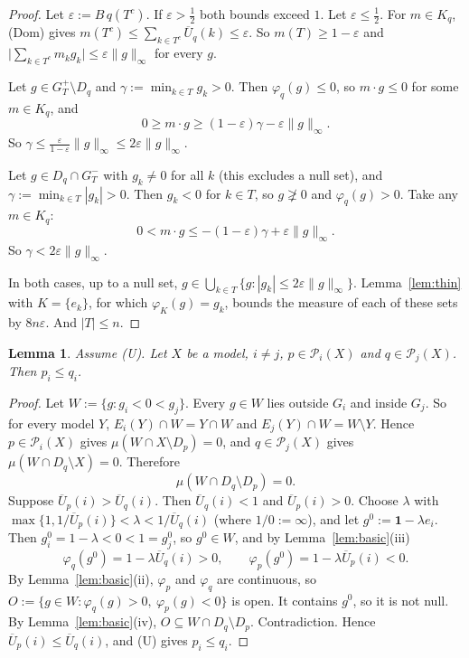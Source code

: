 \documentclass[11pt]{article}
\newtheorem{lemma}[theorem]{Lemma}
\theoremstyle{definition}
\newcommand{\one}{\mathbf 1}
\newcommand{\Pc}{\mathcal P}
\newcommand{\Ub}{\overline U}
\begin{document}
\begin{proof}
Let $\varepsilon:=B\,q(T^c)$. If $\varepsilon>\frac12$ both bounds exceed $1$. Let $\varepsilon\le\frac12$. For $m\in K_q$, (Dom) gives $m(T^c)\le\sum_{k\in T^c}\Ub_q(k)\le\varepsilon$. So $m(T)\ge 1-\varepsilon$ and $\big|\sum_{k\in T^c}m_kg_k\big|\le\varepsilon\|g\|_\infty$ for every $g$.

Let $g\in G_T^+\setminus D_q$ and $\gamma:=\min_{k\in T}g_k>0$. Then $\varphi_q(g)\le 0$, so $m\cdot g\le0$ for some $m\in K_q$, and
\[
0\ge m\cdot g\ge(1-\varepsilon)\gamma-\varepsilon\|g\|_\infty .
\]
So $\gamma\le\frac{\varepsilon}{1-\varepsilon}\|g\|_\infty\le 2\varepsilon\|g\|_\infty$.

Let $g\in D_q\cap G_T^-$ with $g_k\neq0$ for all $k$ (this excludes a null set), and $\gamma:=\min_{k\in T}|g_k|>0$. Then $g_k<0$ for $k\in T$, so $g\not\gneq0$ and $\varphi_q(g)>0$. Take any $m\in K_q$:
\[
0<m\cdot g\le-(1-\varepsilon)\gamma+\varepsilon\|g\|_\infty .
\]
So $\gamma<2\varepsilon\|g\|_\infty$.

In both cases, up to a null set, $g\in\bigcup_{k\in T}\{g:|g_k|\le 2\varepsilon\|g\|_\infty\}$. Lemma~\ref{lem:thin} with $K=\{e_k\}$, for which $\varphi_K(g)=g_k$, bounds the measure of each of these sets by $8n\varepsilon$. And $|T|\le n$.
\end{proof}

\begin{lemma}\label{lem:twoworlds}
Assume (U). Let $X$ be a model, $i\neq j$, $p\in\Pc_i(X)$ and $q\in\Pc_j(X)$. Then $p_i\le q_i$.
\end{lemma}

\begin{proof}
Let $W:=\{g:g_i<0<g_j\}$. Every $g\in W$ lies outside $G_i$ and inside $G_j$. So for every model $Y$, $E_i(Y)\cap W=Y\cap W$ and $E_j(Y)\cap W=W\setminus Y$. Hence $p\in\Pc_i(X)$ gives $\mu(W\cap X\setminus D_p)=0$, and $q\in\Pc_j(X)$ gives $\mu(W\cap D_q\setminus X)=0$. Therefore
\[
\mu(W\cap D_q\setminus D_p)=0.
\]
Suppose $\Ub_p(i)>\Ub_q(i)$. Then $\Ub_q(i)<1$ and $\Ub_p(i)>0$. Choose $\lambda$ with $\max\{1,1/\Ub_p(i)\}<\lambda<1/\Ub_q(i)$ (where $1/0:=\infty$), and let $g^0:=\one-\lambda e_i$. Then $g^0_i=1-\lambda<0<1=g^0_j$, so $g^0\in W$, and by Lemma~\ref{lem:basic}(iii)
\[
\varphi_q(g^0)=1-\lambda\Ub_q(i)>0,\qquad \varphi_p(g^0)=1-\lambda\Ub_p(i)<0.
\]
By Lemma~\ref{lem:basic}(ii), $\varphi_p$ and $\varphi_q$ are continuous, so $O:=\{g\in W:\varphi_q(g)>0,\ \varphi_p(g)<0\}$ is open. It contains $g^0$, so it is not null. By Lemma~\ref{lem:basic}(iv), $O\subseteq W\cap D_q\setminus D_p$. Contradiction. Hence $\Ub_p(i)\le\Ub_q(i)$, and (U) gives $p_i\le q_i$.
\end{proof}
\end{document}
